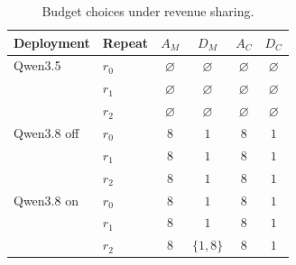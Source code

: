 \begin{table}[t]
\caption{Budget choices under revenue sharing.}
\label{tab:retail-decisions}
\centering\small
\begin{tabular}{@{}llcccc@{}}
\toprule
Deployment & Repeat & $A_M$ & $D_M$ & $A_C$ & $D_C$ \\
\midrule
Qwen3.5 & $r_0$ & $\varnothing$ & $\varnothing$ & $\varnothing$ & $\varnothing$ \\
 & $r_1$ & $\varnothing$ & $\varnothing$ & $\varnothing$ & $\varnothing$ \\
 & $r_2$ & $\varnothing$ & $\varnothing$ & $\varnothing$ & $\varnothing$ \\
Qwen3.8 off & $r_0$ & $8$ & $1$ & $8$ & $1$ \\
 & $r_1$ & $8$ & $1$ & $8$ & $1$ \\
 & $r_2$ & $8$ & $1$ & $8$ & $1$ \\
Qwen3.8 on & $r_0$ & $8$ & $1$ & $8$ & $1$ \\
 & $r_1$ & $8$ & $1$ & $8$ & $1$ \\
 & $r_2$ & $8$ & $\{1,8\}$ & $8$ & $1$ \\
\bottomrule
\end{tabular}
\end{table}
